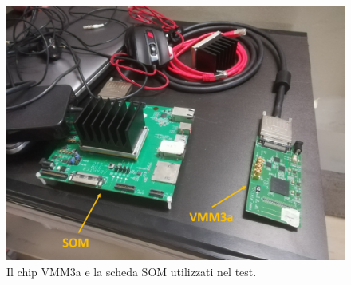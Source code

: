 \begin{figure} [!p]
	\centering
	\includegraphics[width=\textwidth, keepaspectratio]{Grafici/vmm3a_som.png}
	\caption{Il chip VMM3a e la scheda SOM utilizzati nel test.} \label{fig:vmm+som}
\end{figure}